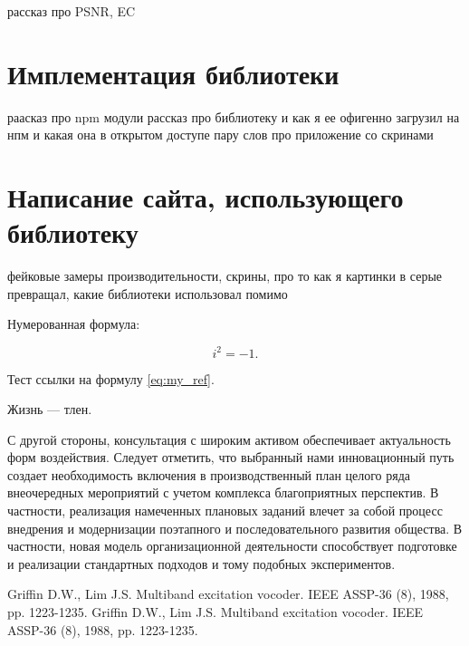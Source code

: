 \documentclass[a4paper,article,14pt]{extarticle}
\begin{document}
рассказ про PSNR, EC

\newpage
\section{Имплементация библиотеки}

раасказ про npm модули
рассказ про библиотеку и как я ее офигенно загрузил на нпм и какая она в открытом доступе
пару слов про приложение со скринами

\newpage
\section{Написание сайта, использующего библиотеку}

фейковые замеры производительности, скрины, про то как я картинки в серые превращал, какие библиотеки использовал помимо



Нумерованная формула:

\begin{equation}
    i^2 = -1.
    \label{eq:my_ref}
\end{equation}

Тест ссылки на формулу \ref{eq:my_ref}.

\newpage
{}
Жизнь --- тлен.
\pagebreak


С другой стороны, консультация с широким активом обеспечивает актуальность форм воздействия. Следует отметить, что выбранный нами инновационный путь создает необходимость включения в производственный план целого ряда внеочередных мероприятий с учетом комплекса благоприятных перспектив. В частности, реализация намеченных плановых заданий влечет за собой процесс внедрения и модернизации поэтапного и последовательного развития общества. В частности, новая модель организационной деятельности способствует подготовке и реализации стандартных подходов и тому подобных экспериментов.

\begin{thebibliography}{1}
 Griffin D.W., Lim J.S. \flqq Multiband excitation vocoder\frqq. IEEE ASSP-36 (8), 1988, pp. 1223-1235.
 Griffin D.W., Lim J.S. \flqq Multiband excitation vocoder\frqq. IEEE ASSP-36 (8), 1988, pp. 1223-1235.
\end{thebibliography}
\end{document}
